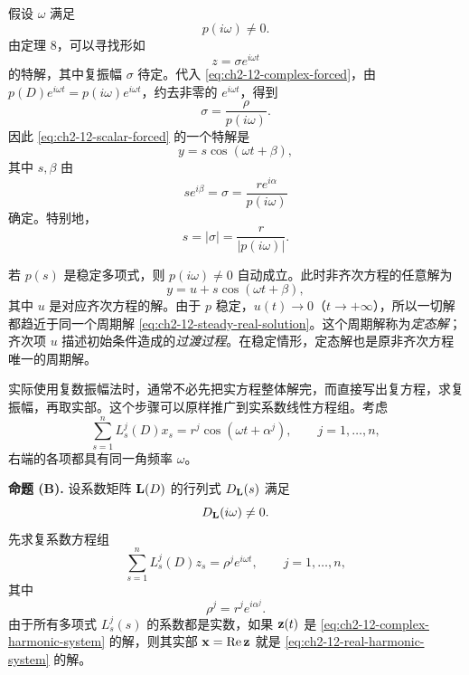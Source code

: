 假设 \(\omega\) 满足
\begin{equation}
 p(i\omega)\ne0.
 \label{eq:ch2-12-nonresonant-frequency}
\end{equation}
由定理 8，可以寻找形如
\begin{equation}
 z=\sigma e^{i\omega t}
 \label{eq:ch2-12-steady-complex-ansatz}
\end{equation}
的特解，其中复振幅 \(\sigma\) 待定。代入 \eqref{eq:ch2-12-complex-forced}，由
\(p(D)e^{i\omega t}=p(i\omega)e^{i\omega t}\)，约去非零的 \(e^{i\omega t}\)，得到
\begin{equation}
 \sigma=\frac{\rho}{p(i\omega)}.
 \label{eq:ch2-12-scalar-complex-amplitude}
\end{equation}
因此 \eqref{eq:ch2-12-scalar-forced} 的一个特解是
\begin{equation}
 y=s\cos(\omega t+\beta),
 \label{eq:ch2-12-steady-real-solution}
\end{equation}
其中 \(s,\beta\) 由
\begin{equation}
 se^{i\beta}=\sigma
 =\frac{re^{i\alpha}}{p(i\omega)}
 \label{eq:ch2-12-real-amplitude-phase}
\end{equation}
确定。特别地，
\begin{equation}
 s=|\sigma|=\frac{r}{|p(i\omega)|}.
 \label{eq:ch2-12-amplitude-formula}
\end{equation}

若 \(p(s)\) 是稳定多项式，则 \(p(i\omega)\ne0\) 自动成立。此时非齐次方程的任意解为
\begin{equation}
 y=u+s\cos(\omega t+\beta),
 \label{eq:ch2-12-steady-plus-transient}
\end{equation}
其中 \(u\) 是对应齐次方程的解。由于 \(p\) 稳定，\(u(t)\to0\)（\(t\to+\infty\)），所以一切解都趋近于同一个周期解 \eqref{eq:ch2-12-steady-real-solution}。这个周期解称为\emph{定态解}；齐次项 \(u\) 描述初始条件造成的\emph{过渡过程}。在稳定情形，定态解也是原非齐次方程唯一的周期解。

实际使用复数振幅法时，通常不必先把实方程整体解完，而直接写出复方程，求复振幅，再取实部。这个步骤可以原样推广到实系数线性方程组。考虑
\begin{equation}
 \sum_{s=1}^nL_s^j(D)x_s
 =r^j\cos(\omega t+\alpha^j),
 \qquad j=1,\ldots,n,
 \label{eq:ch2-12-real-harmonic-system}
 \end{equation}
右端的各项都具有同一角频率 \(\omega\)。

\medskip
\noindent\textbf{命题 (B).}
设系数矩阵 \(\mathbf{L}(D)\) 的行列式 \(D_{\mathbf{L}}(s)\) 满足
\begin{equation}
 D_{\mathbf{L}}(i\omega)\ne0.
 \label{eq:ch2-12-nonresonant-system}
\end{equation}
先求复系数方程组
\begin{equation}
 \sum_{s=1}^nL_s^j(D)z_s
 =\rho^je^{i\omega t},
 \qquad j=1,\ldots,n,
 \label{eq:ch2-12-complex-harmonic-system}
\end{equation}
其中
\[
 \rho^j=r^je^{i\alpha^j}.
\]
由于所有多项式 \(L_s^j(s)\) 的系数都是实数，如果 \(\vect{z}(t)\) 是 \eqref{eq:ch2-12-complex-harmonic-system} 的解，则其实部 \(\vect{x}=\operatorname{Re}\vect{z}\) 就是 \eqref{eq:ch2-12-real-harmonic-system} 的解。

